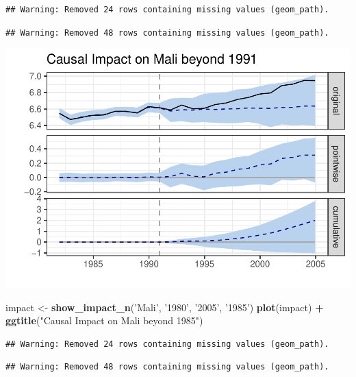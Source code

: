 \documentclass[]{article}
\newenvironment{Shaded}{\begin{snugshade}}{\end{snugshade}}
\newcommand{\KeywordTok}[1]{\textcolor[rgb]{0.13,0.29,0.53}{\textbf{#1}}}
\newcommand{\NormalTok}[1]{#1}
\newcommand{\OperatorTok}[1]{\textcolor[rgb]{0.81,0.36,0.00}{\textbf{#1}}}
\newcommand{\StringTok}[1]{\textcolor[rgb]{0.31,0.60,0.02}{#1}}
\begin{document}
\begin{verbatim}
## Warning: Removed 24 rows containing missing values (geom_path).
\end{verbatim}

\begin{verbatim}
## Warning: Removed 48 rows containing missing values (geom_path).
\end{verbatim}

\includegraphics{ProjectNotebook_files/figure-latex/unnamed-chunk-12-1.pdf}

\begin{Shaded}
\begin{Highlighting}[]
\NormalTok{impact <-}\StringTok{ }\KeywordTok{show_impact_n}\NormalTok{(}\StringTok{'Mali'}\NormalTok{, }\StringTok{'1980'}\NormalTok{, }\StringTok{'2005'}\NormalTok{, }\StringTok{'1985'}\NormalTok{)}
\KeywordTok{plot}\NormalTok{(impact) }\OperatorTok{+}\StringTok{ }\KeywordTok{ggtitle}\NormalTok{(}\StringTok{"Causal Impact on Mali beyond 1985"}\NormalTok{)}
\end{Highlighting}
\end{Shaded}

\begin{verbatim}
## Warning: Removed 24 rows containing missing values (geom_path).
\end{verbatim}

\begin{verbatim}
## Warning: Removed 48 rows containing missing values (geom_path).
\end{verbatim}
\end{document}

